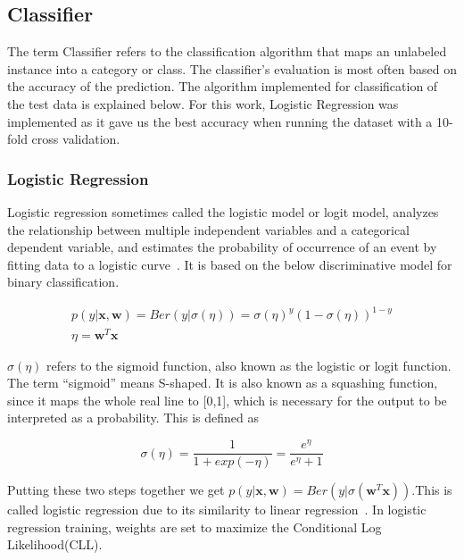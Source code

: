 \documentclass[letterpaper,10pt]{article}
\theoremstyle{mytheor}
\begin{document}

\subsection{Classifier}

The term Classifier refers to the classification algorithm that maps an unlabeled instance into a category or class. The classifier’s evaluation is most often based on the accuracy of the prediction. The algorithm implemented for classification of the test data is explained below. For this work, Logistic Regression was implemented as it gave us the best accuracy when running the dataset with a 10-fold cross validation.

\subsubsection{Logistic Regression}

Logistic regression sometimes called the logistic model or logit model, analyzes the relationship between multiple independent variables and a categorical dependent variable, and estimates the probability of occurrence of an event by fitting data to a logistic curve~\cite{park2013introduction}. It is based on the below discriminative model for binary classification.

\begin{gather}
p(y|\boldsymbol{x},\boldsymbol{w}) = Ber(y|\sigma(\eta)) = \sigma(\eta)^{y}(1 - \sigma(\eta))^{1-y} \\
\eta = \boldsymbol{w}^{T}\boldsymbol{x}
\end{gather}

$\sigma(\eta)$ refers to the sigmoid function, also known as the logistic or logit function. The term “sigmoid” means S-shaped. It is also known as a squashing function, since it maps the whole real line to [0,1], which is necessary for the output to be interpreted as a probability. This is defined as 

\begin{equation}
\sigma(\eta) = \frac{1}{1 + exp(-\eta)} = \frac{e^{\eta}}{e^{\eta} + 1}
\end{equation}

Putting these two steps together we get $p(y|\boldsymbol{x},\boldsymbol{w}) = Ber(y|\sigma( \boldsymbol{w}^{T}\boldsymbol{x}))$.This is called logistic regression due to its similarity to linear regression~\cite{murphy2012machine}. 
In logistic regression training, weights are set to maximize the Conditional Log Likelihood(CLL).
\end{document}
